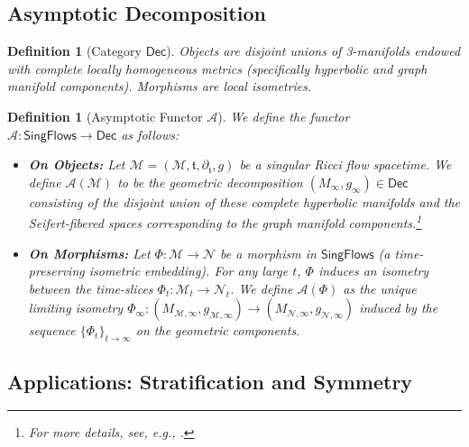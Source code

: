 \documentclass[11pt]{article}
\newtheorem{definition}[theorem]{Definition}
\newcommand{\SingFlows}{\mathsf{SingFlows}}
\newcommand{\Dec}{\mathsf{Dec}}
\begin{document}
\subsection*{Asymptotic Decomposition}
\begin{definition}[Category $\Dec$]
Objects are disjoint unions of 3-manifolds endowed with complete locally homogeneous metrics (specifically hyperbolic and graph manifold components). Morphisms are local isometries.
\end{definition}
\begin{definition}[Asymptotic Functor $\mathcal{A}$]
We define the functor $\mathcal{A}: \SingFlows \to \Dec$ as follows:
\begin{itemize}
    \item[(i)] \textbf{On Objects:} Let $\mathcal{M} = (\mathcal{M}, \mathfrak{t}, \partial_{\mathfrak{t}}, g)$ be a singular Ricci flow spacetime. We define $\mathcal{A}(\mathcal{M})$ to be the geometric decomposition $(M_\infty, g_\infty) \in \Dec$ consisting of the disjoint union of these complete hyperbolic manifolds and the Seifert-fibered spaces corresponding to the graph manifold components.\footnote{For more details, see, e.g., \cite[Section 1.3.]{BK19}.}
    
    \item[(ii)] \textbf{On Morphisms:} Let $\Phi: \mathcal{M} \to \mathcal{N}$ be a morphism in $\SingFlows$ (a time-preserving isometric embedding). For any large $t$, $\Phi$ induces an isometry between the time-slices $\Phi_t: \mathcal{M}_t \to \mathcal{N}_t$. We define $\mathcal{A}(\Phi)$ as the unique limiting isometry $\Phi_\infty: (M_{\mathcal{M},\infty}, g_{\mathcal{M},\infty}) \to (M_{\mathcal{N},\infty}, g_{\mathcal{N},\infty})$ induced by the sequence $\{\Phi_t\}_{t \to \infty}$ on the geometric components.
\end{itemize}
\end{definition}
\subsection*{Applications: Stratification and Symmetry}
\end{document}
